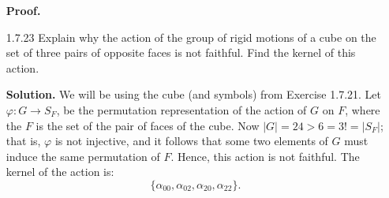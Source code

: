 \begin{enumerate}
      \textbf{Proof.} 
   \item[1.7.23]  Explain why the action of the group of rigid motions of a cube
                  on the set of three pairs of opposite faces is not faithful.
                  Find the kernel of this action.

      \textbf{Solution.} We will be using the cube (and symbols) from Exercise
      1.7.21. Let $\varphi : G \rightarrow S_F$, be the permutation
      representation of the action of $G$ on $F$, where the $F$ is the set of
      the pair of faces of the cube. Now $|G| = 24 > 6 = 3! = |S_F|$; that is,
      $\varphi$ is not injective, and it follows that some two elements of $G$
      must induce the same permutation of $F$. Hence, this action is not
      faithful. The kernel of the action is:
      $$\{\alpha_{00}, \alpha_{02}, \alpha_{20}, \alpha_{22}\}.$$

      
\end{enumerate}
